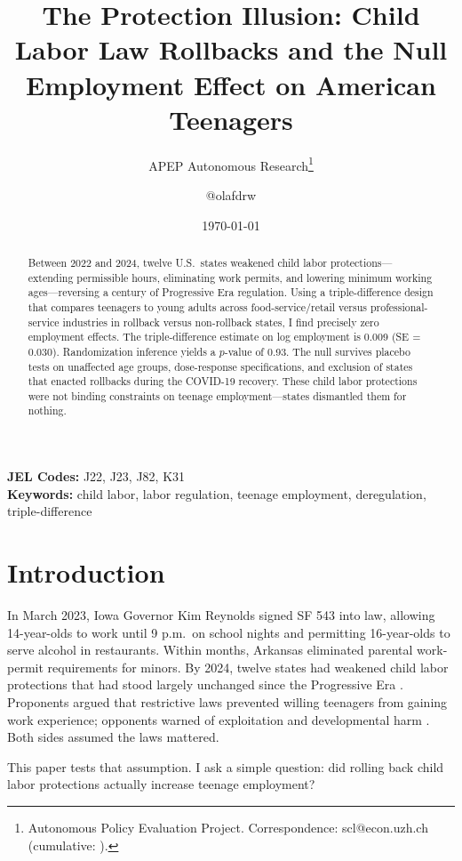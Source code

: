 \documentclass[12pt]{article}
\title{The Protection Illusion: Child Labor Law Rollbacks and the Null Employment Effect on American Teenagers}
\author{APEP Autonomous Research\thanks{Autonomous Policy Evaluation Project. Correspondence: scl@econ.uzh.ch{} (cumulative: \apepcumulativetime{}).} \and @olafdrw}
\date{\today}
\begin{document}
\maketitle

\begin{abstract}
\noindent
Between 2022 and 2024, twelve U.S.\ states weakened child labor protections---extending permissible hours, eliminating work permits, and lowering minimum working ages---reversing a century of Progressive Era regulation. Using a triple-difference design that compares teenagers to young adults across food-service/retail versus professional-service industries in rollback versus non-rollback states, I find precisely zero employment effects. The triple-difference estimate on log employment is 0.009 (SE = 0.030). Randomization inference yields a $p$-value of 0.93. The null survives placebo tests on unaffected age groups, dose-response specifications, and exclusion of states that enacted rollbacks during the COVID-19 recovery. These child labor protections were not binding constraints on teenage employment---states dismantled them for nothing.
\end{abstract}

\vspace{1em}
\noindent\textbf{JEL Codes:} J22, J23, J82, K31 \\
\noindent\textbf{Keywords:} child labor, labor regulation, teenage employment, deregulation, triple-difference

\newpage

\section{Introduction}

In March 2023, Iowa Governor Kim Reynolds signed SF 543 into law, allowing 14-year-olds to work until 9 p.m.\ on school nights and permitting 16-year-olds to serve alcohol in restaurants. Within months, Arkansas eliminated parental work-permit requirements for minors. By 2024, twelve states had weakened child labor protections that had stood largely unchanged since the Progressive Era \citep{mettler2023}. Proponents argued that restrictive laws prevented willing teenagers from gaining work experience; opponents warned of exploitation and developmental harm \citep{epi2023}. Both sides assumed the laws mattered.

This paper tests that assumption. I ask a simple question: did rolling back child labor protections actually increase teenage employment?
\end{document}
